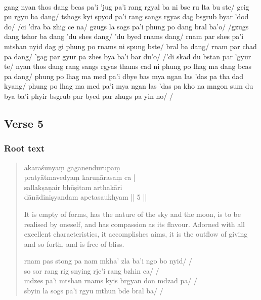 \documentclass[12pt]{article}
\begin{document}
\textbf{\TVB}\\
gang nyan thos dang bcas pa'i 'jug pa'i rang rgyal ba ni bse ru lta bu ste/ gcig pu rgyu ba dang/ tshogs kyi spyod pa'i rang sangs rgyas dag bsgrub byar 'dod do/ /ci 'dra ba zhig ce na/ gzugs la sogs pa'i phung po dang bral ba'o/ /gzugs dang tshor ba dang 'du shes dang/ 'du byed rnams dang/ rnam par shes pa'i mtshan nyid dag gi phung po rnams ni spung bste/ bral ba dang/ rnam par chad pa dang/ 'gag par gyur pa zhes bya ba'i bar du'o/ /'di skad du bstan par 'gyur te/ nyan thos dang rang sangs rgyas thams cad ni phung po lhag ma dang bcas pa dang/ phung po lhag ma med pa'i dbye bas mya ngan las 'das pa tha dad kyang/ phung po lhag ma med pa'i mya ngan las 'das pa kho na mngon sum du bya ba'i phyir bsgrub par byed par zhugs pa yin no/ /

\subsection{Verse 5}
\subsubsection{Root text}
\begin{quote}
	ākāraśūnyaṃ gaganendurūpaṃ \\
	pratyātmavedyaṃ karuṇārasaṃ ca |\\
	sallakṣaṇair bhūṣitam\footnoteB{
		bhūṣitam] \EDD ; bhuṣitam \MS
	} arthakāri \\
	dānādiniṣyandam apetasaukhyam || 5 ||

	It is empty of forms, has the nature of the sky and the moon, is to be realised by oneself, and has compassion as its flavour.
	Adorned with all excellent characteristics, it accomplishes aims, it is the outflow of giving and so forth, and is free of bliss.

	rnam pas stong pa nam mkha' zla ba'i ngo bo nyid/ /\\
	so sor rang rig snying rje'i rang bzhin ca/ /\\
	mdzes pa'i mtshan rnams kyis brgyan don mdzad pa/ /\\
	sbyin la sogs pa'i rgyu mthun bde bral ba/ /
\end{quote}
\end{document}
